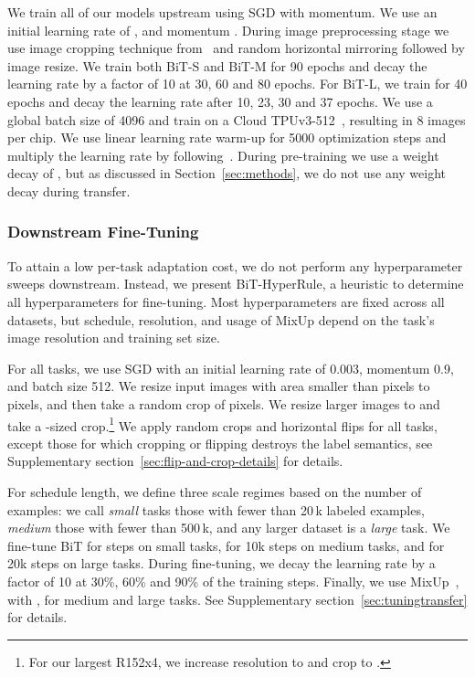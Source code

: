 \documentclass[runningheads]{llncs}
\newcommand{\name}{{BiT}}
\newcommand{\hyper}{{BiT-HyperRule}}
\begin{document}
We train all of our models upstream using SGD with momentum.
We use an initial learning rate of , and momentum .
During image preprocessing stage we use image cropping technique from~\cite{szegedy2015going} and random horizontal mirroring followed by  image resize.
We train both \name{}-S and \name{}-M for 90 epochs and decay the learning rate by a factor of 10 at 30, 60 and 80 epochs.
For \name{}-L, we train for 40 epochs and decay the learning rate after 10, 23, 30 and 37 epochs.
We use a global batch size of 4096 and train on a Cloud TPUv3-512~\cite{jouppi2017datacenter}, resulting in 8 images per chip.
We use linear learning rate warm-up for 5000 optimization steps and multiply the learning rate by  following~\cite{goyal2017accurate}. 
During pre-training we use a weight decay of , but as discussed in Section~\ref{sec:methods}, we do not use any weight decay during transfer.

\subsubsection{Downstream Fine-Tuning}
\label{sec:bit-hp}
To attain a low per-task adaptation cost, we do not perform any hyperparameter sweeps downstream.
Instead, we present \hyper{}, a heuristic to determine all hyperparameters for fine-tuning.
Most hyperparameters are fixed across all datasets, but schedule, resolution, and usage of MixUp depend on the task’s image resolution and training set size.

For all tasks, we use SGD with an initial learning rate of 0.003, momentum 0.9, and batch size 512.
We resize input images with area smaller than  pixels to  pixels, and then take a random crop of  pixels.
We resize larger images to  and take a -sized crop.\footnote{For our largest R152x4, we increase resolution to  and crop to .}
We apply random crops and horizontal flips for all tasks, except those for which cropping or flipping destroys the label semantics, see Supplementary section~\ref{sec:flip-and-crop-details} for details.

For schedule length, we define three scale regimes based on the number of examples:
we call \emph{small} tasks those with fewer than 20\,k labeled examples, 
\emph{medium} those with fewer than 500\,k, 
and any larger dataset is a \emph{large} task.
We fine-tune \name{} for  steps on small tasks, 
for 10k steps on medium tasks, 
and for 20k steps on large tasks.
During fine-tuning, we decay the learning rate by a factor of 10 at 30\%, 60\% and 90\% of the training steps.
Finally, we use MixUp~\cite{mixup}, with , for medium and large tasks.
See Supplementary section~\ref{sec:tuningtransfer} for details.
\end{document}
